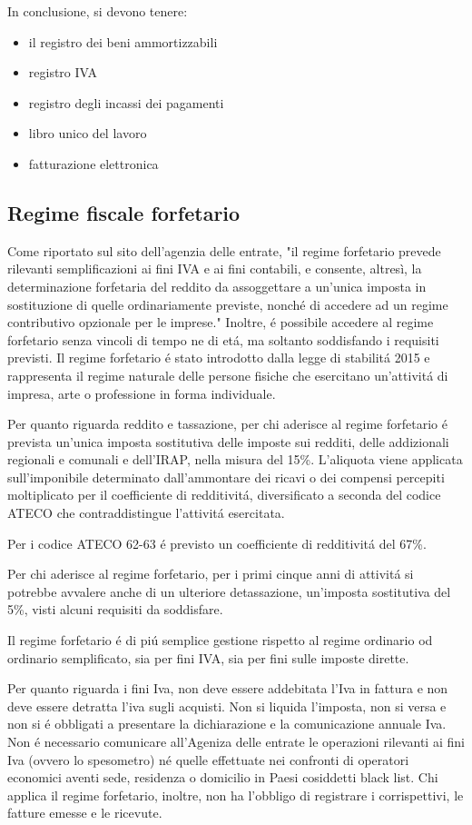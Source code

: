 \documentclass{article}
\begin{document}
In conclusione, si devono tenere:
\begin{itemize}
    \item il registro dei beni ammortizzabili
    \item registro IVA
    \item registro degli incassi dei pagamenti
    \item libro unico del lavoro
    \item fatturazione elettronica
\end{itemize}

\subsection{Regime fiscale forfetario}
Come riportato sul sito dell'agenzia delle entrate, "il regime forfetario prevede rilevanti semplificazioni ai fini IVA e ai fini contabili, e consente, altresì, la determinazione forfetaria del reddito da assoggettare a un’unica imposta in sostituzione di quelle ordinariamente previste, nonché di accedere ad un regime contributivo opzionale per le imprese."
Inoltre, \'e possibile accedere al regime forfetario senza vincoli di tempo ne di et\'a, ma soltanto soddisfando i requisiti previsti.
Il regime forfetario \'e stato introdotto dalla legge di stabilit\'a 2015 e rappresenta il regime naturale delle persone fisiche che esercitano un'attivit\'a di impresa, arte o professione in forma individuale.

Per quanto riguarda reddito e tassazione, per chi aderisce al regime forfetario \'e prevista un'unica imposta sostitutiva delle imposte sui redditi, delle addizionali regionali e comunali e dell'IRAP, nella misura del 15\%. 
L'aliquota viene applicata sull'imponibile determinato dall'ammontare dei ricavi o dei compensi percepiti moltiplicato per il coefficiente di redditivit\'a, diversificato a seconda del codice ATECO che contraddistingue l'attivit\'a esercitata.

Per i codice ATECO 62-63 \'e previsto un coefficiente di redditivit\'a del 67\%.

Per chi aderisce al regime forfetario, per i primi cinque anni di attivit\'a si potrebbe avvalere anche di un ulteriore detassazione, un'imposta sostitutiva del 5\%, visti alcuni requisiti da soddisfare.

Il regime forfetario \'e di pi\'u semplice gestione rispetto al regime ordinario od ordinario semplificato, sia per fini IVA, sia per fini sulle imposte dirette. 

Per quanto riguarda i fini Iva, non deve essere addebitata l'Iva in fattura e non deve essere detratta l'iva sugli acquisti. Non si liquida l'imposta, non si versa e non si \'e obbligati a presentare la dichiarazione e la comunicazione annuale Iva. 
Non \'e necessario comunicare all'Ageniza delle entrate le operazioni rilevanti ai fini Iva (ovvero lo spesometro) né quelle effettuate nei confronti di operatori economici aventi sede, residenza o domicilio in Paesi cosiddetti black list. Chi applica il regime forfetario, inoltre, non ha l'obbligo di registrare i corrispettivi, le fatture emesse e le ricevute.
\end{document}
